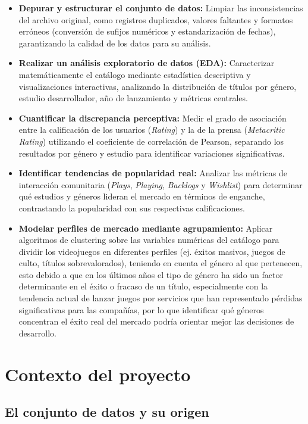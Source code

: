 \documentclass[letterpaper,11pt]{article}
\begin{document}
\begin{itemize}
    \item \textbf{Depurar y estructurar el conjunto de datos:} Limpiar las inconsistencias del archivo original, como registros duplicados, valores faltantes y formatos erróneos (conversión de sufijos numéricos y estandarización de fechas), garantizando la calidad de los datos para su análisis.
    \item \textbf{Realizar un análisis exploratorio de datos (EDA):} Caracterizar matemáticamente el catálogo mediante estadística descriptiva y visualizaciones interactivas, analizando la distribución de títulos por género, estudio desarrollador, año de lanzamiento y métricas centrales.
    \item \textbf{Cuantificar la discrepancia perceptiva:} Medir el grado de asociación entre la calificación de los usuarios (\textit{Rating}) y la de la prensa (\textit{Metacritic Rating}) utilizando el coeficiente de correlación de Pearson, separando los resultados por género y estudio para identificar variaciones significativas.
    \item \textbf{Identificar tendencias de popularidad real:} Analizar las métricas de interacción comunitaria (\textit{Plays}, \textit{Playing}, \textit{Backlogs} y \textit{Wishlist}) para determinar qué estudios y géneros lideran el mercado en términos de enganche, contrastando la popularidad con sus respectivas calificaciones.
    \item \textbf{Modelar perfiles de mercado mediante agrupamiento:} Aplicar algoritmos de clustering sobre las variables numéricas del catálogo para dividir los videojuegos en diferentes perfiles (ej. éxitos masivos, juegos de culto, títulos sobrevalorados), teniendo en cuenta el género al que pertenecen, esto debido a que en los últimos años el tipo de género ha sido un factor determinante en el éxito o fracaso de un título, especialmente con la tendencia actual de lanzar juegos por servicios que han representado pérdidas significativas para las compañías, por lo que identificar qué géneros concentran el éxito real del mercado podría orientar mejor las decisiones de desarrollo.
\end{itemize}


\newpage

\section{Contexto del proyecto}

\subsection{El conjunto de datos y su origen}
\end{document}

